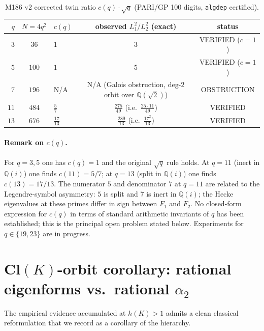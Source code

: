 \documentclass[12pt]{amsart}
\theoremstyle{definition}
\newcommand{\Q}{\mathbb{Q}}
\begin{document}
\begin{table}[h]
  \caption{M186 v2 corrected twin ratio $c(q)\cdot\sqrt{q}$
  (PARI/GP 100 digits, \texttt{algdep} certified).}
  \label{tab:M186}
  \renewcommand{\arraystretch}{1.25}
  \begin{tabular}{rclcc}
    \toprule
    $q$ & $N=4q^2$ & $c(q)$ & observed $L_1^2/L_2^2$ (exact) & status \\
    \midrule
    $3$  & $36$  & $1$           & $3$            & VERIFIED ($c=1$) \\
    $5$  & $100$ & $1$           & $5$            & VERIFIED ($c=1$) \\
    $7$  & $196$ & N/A           & N/A (Galois obstruction, deg-$2$ orbit over $\Q(\sqrt{2})$) & OBSTRUCTION \\
    $11$ & $484$ & $\tfrac{5}{7}$  & $\tfrac{275}{49}$ (i.e.\ $\tfrac{25\cdot 11}{49}$) & VERIFIED \\
    $13$ & $676$ & $\tfrac{17}{13}$ & $\tfrac{289}{13}$ (i.e.\ $\tfrac{17^2}{13}$) & VERIFIED \\
    \bottomrule
  \end{tabular}
\end{table}

\paragraph{Remark on $c(q)$.}
For $q=3,5$ one has $c(q)=1$ and the original $\sqrt{q}$ rule holds.
At $q=11$ (inert in $\Q(i)$) one finds $c(11)=5/7$; at $q=13$ (split in
$\Q(i)$) one finds $c(13)=17/13$.  The numerator $5$ and denominator $7$
at $q=11$ are related to the Legendre-symbol asymmetry: $5$ is split and
$7$ is inert in $\Q(i)$; the Hecke eigenvalues at these primes differ in
sign between $F_1$ and $F_2$.  No closed-form expression for $c(q)$ in
terms of standard arithmetic invariants of $q$ has been established; this
is the principal open problem stated below.  Experiments for $q\in\{19,23\}$
are in progress.

\section{Cl$(K)$-orbit corollary: rational eigenforms vs.\ rational $\alpha_2$}
\label{sec:CK-orbit}

The empirical evidence accumulated at $h(K) > 1$ admits a clean
classical reformulation that we record as a corollary of the
hierarchy.
\end{document}
